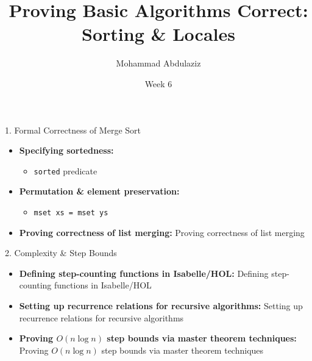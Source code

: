 \documentclass[compress,10pt,xcolor=dvipsnames]{beamer}
\title[Proving Basic Algorithms Correct]{Proving Basic Algorithms Correct: Sorting & Locales}
\author[7CCSACTP]{Mohammad Abdulaziz}
\date{Week 6}
\begin{document}

\begin{frame}{1. Formal Correctness of Merge Sort}

\begin{itemize}
  \item \textbf{Specifying sortedness:}
    \begin{itemize}
      \item \texttt{sorted} predicate
    \end{itemize}
  \item \textbf{Permutation & element preservation:}
    \begin{itemize}
      \item \texttt{mset xs = mset ys}
    \end{itemize}
  \item \textbf{Proving correctness of list merging:} Proving correctness of list merging
\end{itemize}
\end{frame}

\begin{frame}{2. Complexity & Step Bounds}

\begin{itemize}
  \item \textbf{Defining step-counting functions in Isabelle/HOL:} Defining step-counting functions in Isabelle/HOL
  \item \textbf{Setting up recurrence relations for recursive algorithms:} Setting up recurrence relations for recursive algorithms
  \item \textbf{Proving $O(n \log n)$ step bounds via master theorem techniques:} Proving $O(n \log n)$ step bounds via master theorem techniques
\end{itemize}
\end{frame}
\end{document}
